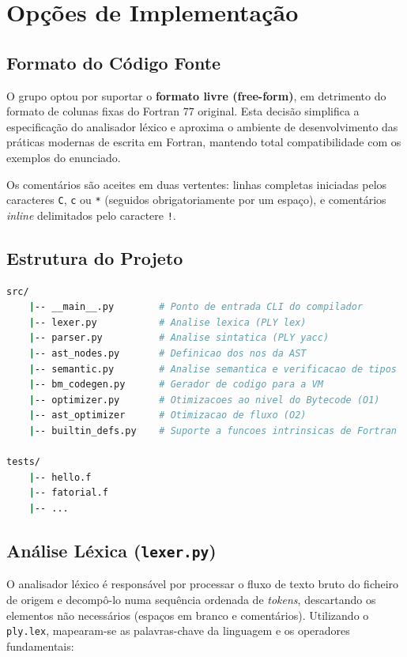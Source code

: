 \documentclass[12pt, a4paper]{article}
\begin{document}
\section{Opções de Implementação}

\subsection{Formato do Código Fonte}
O grupo optou por suportar o \textbf{formato livre (free-form)}, em detrimento do formato de colunas fixas do Fortran 77 original. Esta decisão simplifica a especificação do analisador léxico e aproxima o ambiente de desenvolvimento das práticas modernas de escrita em Fortran, mantendo total compatibilidade com os exemplos do enunciado.

Os comentários são aceites em duas vertentes: linhas completas iniciadas pelos caracteres \texttt{C}, \texttt{c} ou \texttt{*} (seguidos obrigatoriamente por um espaço), e comentários \textit{inline} delimitados pelo caractere \texttt{!}.

\subsection{Estrutura do Projeto}
\begin{lstlisting}[language=bash, caption=Estrutura de diretórios do projeto]
src/
    |-- __main__.py        # Ponto de entrada CLI do compilador
    |-- lexer.py           # Analise lexica (PLY lex)
    |-- parser.py          # Analise sintatica (PLY yacc)
    |-- ast_nodes.py       # Definicao dos nos da AST
    |-- semantic.py        # Analise semantica e verificacao de tipos
    |-- bm_codegen.py      # Gerador de codigo para a VM
    |-- optimizer.py       # Otimizacoes ao nivel do Bytecode (O1)
    |-- ast_optimizer      # Otimizacao de fluxo (O2)
    |-- builtin_defs.py    # Suporte a funcoes intrinsicas de Fortran

tests/
    |-- hello.f
    |-- fatorial.f
    |-- ...
\end{lstlisting}

\subsection{Análise Léxica (\texttt{lexer.py})}
O analisador léxico é responsável por processar o fluxo de texto bruto do ficheiro de origem e decompô-lo numa sequência ordenada de \textit{tokens}, descartando os elementos não necessários (espaços em branco e comentários). Utilizando o \texttt{ply.lex}, mapearam-se as palavras-chave da linguagem e os operadores fundamentais:
\end{document}
